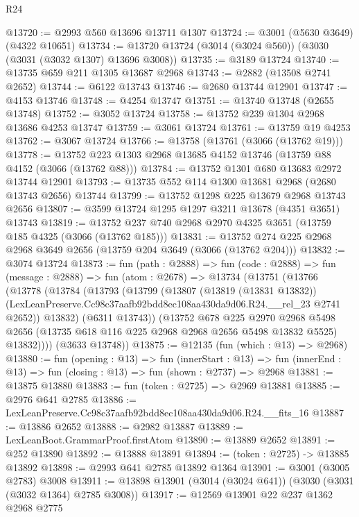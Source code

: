 \begin{lexlean}{R24}
\begin{coremodule}
@13720 := @2993 @560 @13696 @13711 @1307
@13724 := @3001 (@5630 @3649) (@4322 @10651)
@13734 := @13720 @13724 (@3014 (@3024 @560)) (@3030 (@3031 (@3032 @1307) @13696 @3008))
@13735 := @3189 @13724
@13740 := @13735 @659 @211 @1305 @13687 @2968
@13743 := @2882 (@13508 @2741 @2652)
@13744 := @6122 @13743
@13746 := @2680 @13744 @12901
@13747 := @4153 @13746
@13748 := @4254 @13747
@13751 := @13740 @13748 (@2655 @13748)
@13752 := @3052 @13724
@13758 := @13752 @239 @1304 @2968 @13686 @4253 @13747
@13759 := @3061 @13724
@13761 := @13759 @19 @4253
@13762 := @3067 @13724
@13766 := @13758 (@13761 (@3066 (@13762 @19)))
@13778 := @13752 @223 @1303 @2968 @13685 @4152 @13746 (@13759 @88 @4152 (@3066 (@13762 @88)))
@13784 := @13752 @1301 @680 @13683 @2972 @13744 @12901
@13793 := @13735 @552 @114 @1300 @13681 @2968 (@2680 @13743 @2656) @13744
@13799 := @13752 @1298 @225 @13679 @2968 @13743 @2656
@13807 := @3599 @13724 @1295 @1297 @3211 @13678 (@4351 @3651) @13743
@13819 := @13752 @237 @740 @2968 @2970 @4325 @3651 (@13759 @185 @4325 (@3066 (@13762 @185)))
@13831 := @13752 @274 @225 @2968 @2968 @3649 @2656 (@13759 @204 @3649 (@3066 (@13762 @204)))
@13832 := @3074 @13724
@13873 := fun (path : @2888) =>
  fun (code : @2888) =>
  fun (message : @2888) =>
  fun (atom : @2678) =>
  @13734
    (@13751
      (@13766
        (@13778
          (@13784
            (@13793
              (@13799
                (@13807
                  (@13819 (@13831 @13832))
                  (LexLeanPreserve.Cc98c37aafb92bdd8ec108aa430da9d06.R24.__rel_23 @2741 @2652))
                @13832)
              (@6311 @13743))
            (@13752
              @678
              @225
              @2970
              @2968
              @5498
              @2656
              (@13735 @618 @116 @225 @2968 @2968 @2656 @5498 @13832 @5525)
              @13832))))
      (@3633 @13748))
@13875 := @12135 (fun (which : @13) => @2968)
@13880 := fun (opening : @13) =>
  fun (innerStart : @13) =>
  fun (innerEnd : @13) => fun (closing : @13) => fun (shown : @2737) => @2968
@13881 := @13875 @13880
@13883 := fun (token : @2725) => @2969 @13881
@13885 := @2976 @641 @2785
@13886 := LexLeanPreserve.Cc98c37aafb92bdd8ec108aa430da9d06.R24.__fits_16
@13887 := @13886 @2652
@13888 := @2982 @13887
@13889 := LexLeanBoot.GrammarProof.firstAtom
@13890 := @13889 @2652
@13891 := @252 @13890
@13892 := @13888 @13891
@13894 := (token : @2725) -> @13885 @13892
@13898 := @2993 @641 @2785 @13892 @1364
@13901 := @3001 (@3005 @2783) @3008
@13911 := @13898 @13901 (@3014 (@3024 @641)) (@3030 (@3031 (@3032 @1364) @2785 @3008))
@13917 := @12569 @13901 @22 @237 @1362 @2968 @2775

\end{coremodule}
\end{lexlean}
